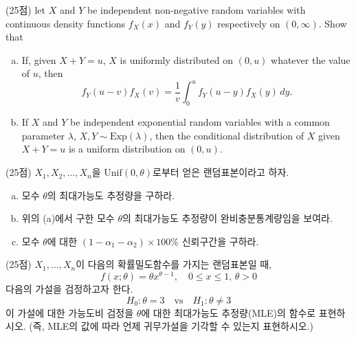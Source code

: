 \documentclass[answers]{exam}
\begin{document}
\newpage
{}
\begin{questions}
   \question
    (25점) let $X$ and $Y$ be independent non-negative random variables with continuous density functions $f_{X}\left(x\right)$ and $f_{Y}\left(y\right)$ respectively on $\left(0,\infty\right)$. Show that
    \begin{enumerate}[(a)]
      \item If, given $X+Y=u$, $X$ is uniformly distributed on $(0,u)$ whatever the value of $u$, then
      $$
        f_{Y}\left(u-v\right)f_{X}\left(v\right) = \dfrac{1}{v}\int_{0}^{u}f_{Y}\left(u-y\right)f_{X}\left(y\right)\,dy.
      $$
      \item If $X$ and $Y$ be independent exponential random variables with a common parameter $\lambda$, $X,Y\sim \mathrm{Exp}\left(\lambda\right)$, then the conditional distribution of $X$ given $X+Y=u$ is a uniform distribution on $\left(0,u\right)$.
    \end{enumerate}
    \begin{solution}

    \end{solution}
    \question
    (25점) $X_{1},X_{2},\ldots,X_{n}$을 $\mathrm{Unif}\left(0,\theta\right)$로부터 얻은 랜덤표본이라고 하자.
    \begin{enumerate}[(a)]
      \item 모수 $\theta$의 최대가능도 추정량을 구하라.
      \item 위의 (a)에서 구한 모수 $\theta$의 최대가능도 추정량이 완비충분통계량임을 보여라.
      \item 모수 $\theta$에 대한 $\left(1-\alpha_{1}-\alpha_{2}\right)\times 100\%$ 신뢰구간을 구하라.
    \end{enumerate}
    \begin{solution}

    \end{solution}
    \question
    (25점) $X_{1},\ldots,X_{n}$이 다음의 확률밀도함수를 가지는 랜덤표본일 때,
    $$
      f\left(x;\theta\right)=\theta x^{\theta-1},\quad 0\leq x \leq 1,\, \theta>0
    $$
    다음의 가설을 검정하고자 한다.
    $$
      H_{0}:\theta=3 \quad \text{vs} \quad H_{1}:\theta\neq 3
    $$
    이 가설에 대한 가능도비 검정을 $\theta$에 대한 최대가능도 추정량(MLE)의 함수로 표현하시오. (즉, MLE의 값에 따라 언제 귀무가설을 기각할 수 있는지 표현하시오.)
    \begin{solution}


\end{solution}
\end{questions}
\end{document}
